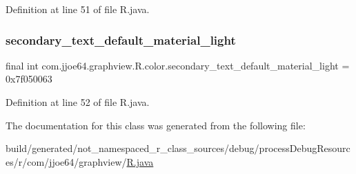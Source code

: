 Definition at line 51 of file R.\+java.

\mbox{\label{classcom_1_1jjoe64_1_1graphview_1_1_r_1_1color_ac5da7af8d455e93b3263c1f7c0f1cf66}} 
\subsubsection{\texorpdfstring{secondary\_text\_default\_material\_light}{secondary\_text\_default\_material\_light}}
{\footnotesize\ttfamily final int com.\+jjoe64.\+graphview.\+R.\+color.\+secondary\+\_\+text\+\_\+default\+\_\+material\+\_\+light = 0x7f050063\hspace{0.3cm}{\ttfamily [static]}}



Definition at line 52 of file R.\+java.



The documentation for this class was generated from the following file\+:\begin{DoxyCompactItemize}
\item 
build/generated/not\+\_\+namespaced\+\_\+r\+\_\+class\+\_\+sources/debug/process\+Debug\+Resources/r/com/jjoe64/graphview/\mbox{\hyperlink{com_2jjoe64_2graphview_2_r_8java}{R.\+java}}\end{DoxyCompactItemize}
